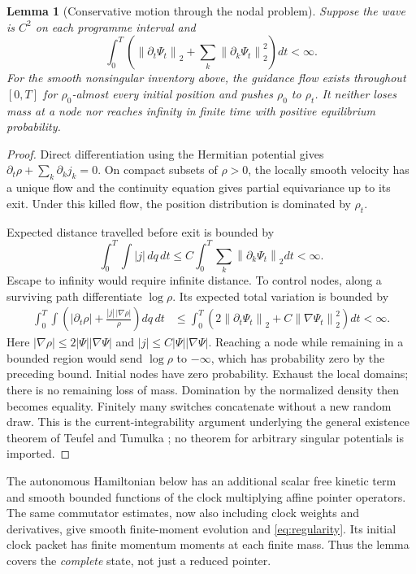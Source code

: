 \documentclass[11pt]{article}
\newtheorem{lemma}[theorem]{Lemma}
\theoremstyle{definition}\newtheorem{assumption}[theorem]{Constitutive assumption}
\theoremstyle{remark}\newtheorem{remark}[theorem]{Remark}
\newcommand{\norm}[1]{\left\|#1\right\|}\newcommand{\pos}[1]{[#1]_+}
\begin{document}
\begin{lemma}[Conservative motion through the nodal problem]\label{lem:exist}
Suppose the wave is $C^2$ on each programme interval and
\begin{equation}\label{eq:regularity}
 \int_0^T\left(\norm{\partial_t\Psi_t}_2+
       \sum_k\norm{\partial_k\Psi_t}_2^2\right)dt<\infty.
\end{equation}
For the smooth nonsingular inventory above, the guidance flow exists throughout $[0,T]$ for $\rho_0$-almost every initial position and pushes $\rho_0$ to $\rho_t$. It neither loses mass at a node nor reaches infinity in finite time with positive equilibrium probability.
\end{lemma}
\begin{proof}
Direct differentiation using the Hermitian potential gives $\partial_t\rho+\sum_k\partial_kj_k=0$. On compact subsets of $\rho>0$, the locally smooth velocity has a unique flow and the continuity equation gives partial equivariance up to its exit. Under this killed flow, the position distribution is dominated by $\rho_t$.

Expected distance travelled before exit is bounded by
\[
 \int_0^T\!\int |j|\,dq\,dt
 \le C\int_0^T\sum_k\norm{\partial_k\Psi_t}_2dt<\infty.
\]
Escape to infinity would require infinite distance. To control nodes, along a surviving path differentiate $\log\rho$. Its expected total variation is bounded by
\begin{align*}
 \int_0^T\!\int\left(|\partial_t\rho|
       +\frac{|j|\,|\nabla\rho|}{\rho}\right)dq\,dt
 &\le\int_0^T\left(2\norm{\partial_t\Psi_t}_2
                  +C\norm{\nabla\Psi_t}_2^2\right)dt<\infty.
\end{align*}
Here $|\nabla\rho|\le2|\Psi||\nabla\Psi|$ and $|j|\le C|\Psi||\nabla\Psi|$. Reaching a node while remaining in a bounded region would send $\log\rho$ to $-\infty$, which has probability zero by the preceding bound. Initial nodes have zero probability. Exhaust the local domains; there is no remaining loss of mass. Domination by the normalized density then becomes equality. Finitely many switches concatenate without a new random draw. This is the current-integrability argument underlying the general existence theorem of Teufel and Tumulka \cite{TT}; no theorem for arbitrary singular potentials is imported.
\end{proof}
The autonomous Hamiltonian below has an additional scalar free kinetic term and smooth bounded functions of the clock multiplying affine pointer operators. The same commutator estimates, now also including clock weights and derivatives, give smooth finite-moment evolution and \eqref{eq:regularity}. Its initial clock packet has finite momentum moments at each finite mass. Thus the lemma covers the \emph{complete} state, not just a reduced pointer.
\end{document}
